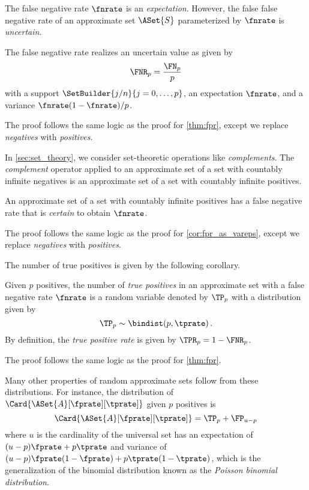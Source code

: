 \documentclass[ ../main.tex]{subfiles}
\begin{document}
The false negative rate $\fnrate$ is an \emph{expectation}.
However, the false false negative rate of an approximate set $\ASet{S}$ parameterized by $\fnrate$ is \emph{uncertain}.
\begin{theorem}
\label{thm:fnr}
The false negative rate realizes an uncertain value as given by
\begin{equation}
    \FNR_p = \frac{\FN_p}{p}
\end{equation}
with a support $\SetBuilder{j / n}{j = 0,\ldots,p}$, an expectation 
$\fnrate$, 
and a variance $\fnrate(1-\fnrate) / p$.
\end{theorem}
The proof follows the same logic as the proof for \cref{thm:fpr}, except we 
replace \emph{negatives} with \emph{positives}.

In \cref{sec:set_theory}, we consider set-theoretic operations like 
\emph{complements}. The \emph{complement} operator applied to an approximate 
set 
of a set with countably infinite negatives is an approximate set of a set with 
countably infinite positives.
\begin{corollary}
An approximate set of a set with countably infinite positives has a false 
negative rate that is \emph{certain} to obtain $\fnrate$.
\end{corollary}
The proof follows the same logic as the proof for \cref{cor:fpr_as_vareps}, 
except we replace \emph{negatives} with \emph{positives}.

The number of true positives is given by the following corollary.
\begin{corollary}
\label{cor:tpbinom}
Given $p$ positives, the number of \emph{true positives} in an approximate set 
with a false negative rate $\fnrate$ is a random variable denoted by $\TP_p$
with a distribution given by 
\begin{equation}
    \TP_p \sim \bindist(p, \tprate)\,.
\end{equation}
By definition, the \emph{true positive rate} is given by $\TPR_p = 1 - 
\FNR_p$.
\end{corollary}
The proof follows the same logic as the proof for \cref{thm:fpr}.

Many other properties of random approximate sets follow from these distributions.
For instance, the distribution of $\Card{\ASet{A}[\fprate][\tprate]}$ given $p$ positives is
\begin{equation}
	\Card{\ASet{A}[\fprate][\tprate]} = \TP_p + \FP_{u - p}
\end{equation}
where $u$ is the cardinality of the universal set has an expectation of $(u - p) \fprate + p \tprate$ and variance of $(u - p) \fprate(1-\fprate) + p \tprate(1-\tprate)$, which is the generalization of the binomial distribution known as the \emph{Poisson binomial distribution}.
\end{document}
